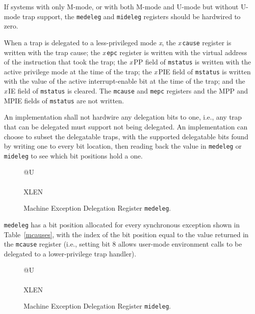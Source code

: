 If systems with only M-mode, or with both M-mode and U-mode but
without U-mode trap support, the {\tt medeleg} and {\tt mideleg}
registers should be hardwired to zero.

When a trap is delegated to a less-privileged mode {\em x}, the
{\em x}\,{\tt cause} register is written with the trap cause; the
{\em x}\,{\tt epc} register is written with the virtual address of
the instruction that took the trap; the {\em x}\,PP field
of {\tt mstatus} is written with the active privilege mode at the time of
the trap; the {\em x}\,PIE field of {\tt mstatus} is written with the
value of the active interrupt-enable bit at the time of the trap; and
the {\em x}\,IE field of {\tt mstatus} is cleared.  The {\tt mcause} and
{\tt mepc} registers and the MPP and MPIE fields of {\tt mstatus} are
not written.

An implementation shall not hardwire any delegation bits to one, i.e.,
any trap that can be delegated must support not being delegated.  An
implementation can choose to subset the delegatable traps, with the
supported delegatable bits found by writing one to every bit location,
then reading back the value in {\tt medeleg} or {\tt mideleg} to see
which bit positions hold a one.

\begin{figure}[h!]
{\footnotesize
\begin{center}
\begin{tabular}{@{}U}
 \\
\hline
{} \\
\hline
XLEN \\
\end{tabular}
\end{center}
}
\vspace{-0.1in}
\caption{Machine Exception Delegation Register {\tt medeleg}.}
\label{medelegreg}
\end{figure}

{\tt medeleg} has a bit position allocated for every synchronous exception
shown in Table~\ref{mcauses}, with the index of the bit position equal to the
value returned in the {\tt mcause} register (i.e., setting bit 8 allows
user-mode environment calls to be delegated to a lower-privilege trap
handler).

\begin{figure}[h!]
{\footnotesize
\begin{center}
\begin{tabular}{@{}U}
 \\
\hline
{} \\
\hline
XLEN \\
\end{tabular}
\end{center}
}
\vspace{-0.1in}
\caption{Machine Exception Delegation Register {\tt mideleg}.}
\label{midelegreg}
\end{figure}

